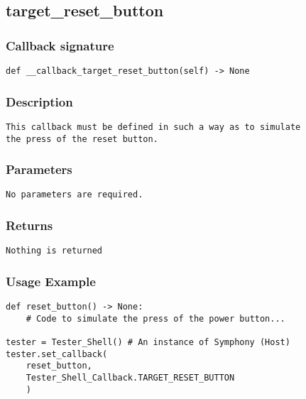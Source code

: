 \subsection{target\_reset\_button}

\subsubsection{Callback signature}
\begin{lstlisting}
def __callback_target_reset_button(self) -> None
\end{lstlisting}

\subsubsection{Description}
\begin{lstlisting}[mathescape=true, keywordstyle=\color{black}, showstringspaces=false]
This callback must be defined in such a way as to simulate 
the press of the reset button. 
\end{lstlisting}

\subsubsection{Parameters}
\begin{lstlisting}[mathescape=true, keywordstyle=\color{black}]
No parameters are required.
\end{lstlisting}

\subsubsection{Returns}
\begin{lstlisting}[mathescape=true, keywordstyle=\color{black}]
Nothing is returned
\end{lstlisting}


\subsubsection{Usage Example}
\begin{lstlisting}
def reset_button() -> None:
    # Code to simulate the press of the power button...

tester = Tester_Shell() # An instance of Symphony (Host)
tester.set_callback(
    reset_button,
    Tester_Shell_Callback.TARGET_RESET_BUTTON
    )
\end{lstlisting}
